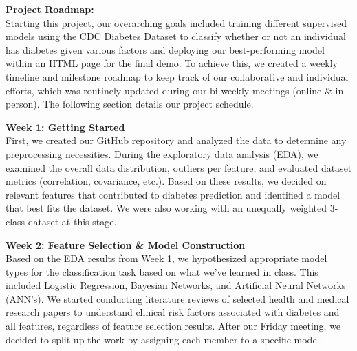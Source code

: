 \documentclass[conference]{IEEEtran}
\begin{document}
\noindent \textbf{Project Roadmap:}\\
Starting this project, our overarching goals included training different supervised models using the CDC Diabetes Dataset to classify whether or not an individual has diabetes given various factors and deploying our best-performing model within an HTML page for the final demo. To achieve this, we created a weekly timeline and milestone roadmap to keep track of our collaborative and individual efforts, which was routinely updated during our bi-weekly meetings (online \& in person). The following section details our project schedule.

\vspace{1em}
\noindent

\noindent \textbf{Week 1: Getting Started}\\
First, we created our GitHub repository and analyzed the data to determine any preprocessing necessities. During the exploratory data analysis (EDA), we examined the overall data distribution, outliers per feature, and evaluated dataset metrics (correlation, covariance, etc.). Based on these results, we decided on relevant features that contributed to diabetes prediction and identified a model that best fits the dataset. We were also working with an unequally weighted 3-class dataset at this stage.

\vspace{1em}

\noindent \textbf{Week 2: Feature Selection \& Model Construction}\\
Based on the EDA results from Week 1, we hypothesized appropriate model types for the classification task based on what we’ve learned in class. This included Logistic Regression, Bayesian Networks, and Artificial Neural Networks (ANN’s). We started conducting literature reviews of selected health and medical research papers to understand clinical risk factors associated with diabetes and all features, regardless of feature selection results. After our Friday meeting, we decided to split up the work by assigning each member to a specific model.

\vspace{1em}
\end{document}
